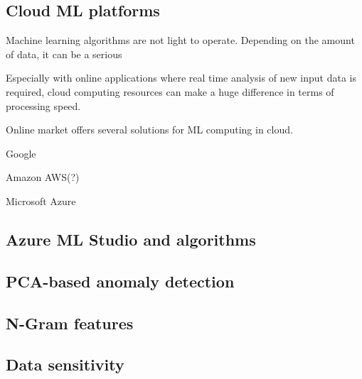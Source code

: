 \subsection{Cloud ML platforms}\label{subsec:bg-cloud-ml-platforms}

Machine learning algorithms are not light to operate.
Depending on the amount of data,
it can be a serious %

Especially with online applications
where real time analysis of new input data is required,
cloud computing resources can make a huge difference
in terms of processing speed. %

Online market offers several solutions for ML computing in cloud.

Google

Amazon AWS(?)

Microsoft Azure\cite{altexsoft}




\subsection{Azure ML Studio and algorithms}\label{subsec:bg-azure-ml-studio-algorithms}




\subsection{PCA-based anomaly detection}\label{subsec:bg-pca-ada}



\subsection{N-Gram features}\label{subsec:bg-ngram-features}


\subsection{Data sensitivity}\label{subsec:bg-data-sensitivity}

